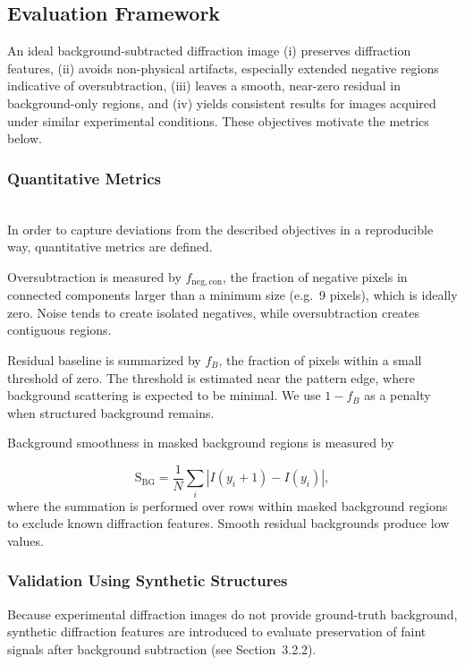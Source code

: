 \documentclass[11pt,onecolumn]{IEEEtran}
\begin{document}
\subsection{Evaluation Framework}

An ideal background-subtracted diffraction image (i) preserves diffraction features, (ii) avoids non-physical artifacts, especially extended negative regions indicative of oversubtraction, (iii) leaves a smooth, near-zero residual in background-only regions, and (iv) yields consistent results for images acquired under similar experimental conditions. These objectives motivate the metrics below.


\subsubsection{Quantitative Metrics}\\

In order to capture deviations from the described objectives in a reproducible way, quantitative metrics are defined.

Oversubtraction is measured by $f_{\mathrm{neg,con}}$, the fraction of negative pixels in connected components larger than a minimum size (e.g.\ 9 pixels), which is ideally zero. Noise tends to create isolated negatives, while oversubtraction creates contiguous regions.

Residual baseline is summarized by $f_B$, the fraction of pixels within a small threshold of zero. The threshold is estimated near the pattern edge, where background scattering is expected to be minimal. We use $1-f_B$ as a penalty when structured background remains.

Background smoothness in masked background regions is measured by

\begin{equation}
\mathrm{S}_{\mathrm{BG}} =
\frac{1}{N} \sum_i \left| I(y_i + 1) - I(y_i) \right|,
\end{equation}
where the summation is performed over rows within masked background regions to exclude known diffraction features. Smooth residual backgrounds produce low values.

\subsubsection{Validation Using Synthetic Structures}

Because experimental diffraction images do not provide ground-truth background, synthetic diffraction features are introduced to evaluate preservation of faint signals after background subtraction (see Section~3.2.2). 
\end{document}
